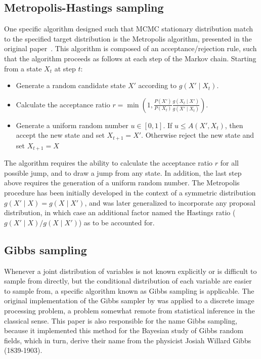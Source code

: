 \subsection{Metropolis-Hastings sampling}

One specific algorithm designed such that MCMC stationary distribution match to the specified target distribution is the Metropolis algorithm, presented in the original paper~\citep{Metropolis1953}.
This algorithm is composed of an acceptance/rejection rule, such that the algorithm proceeds as follows at each step of the Markov chain.
Starting from a state $X_t$ at step $t$:
\begin{itemize}
    \item Generate a random candidate state $X'$ according to $g(X'\mid X_t)$.
    \item Calculate the acceptance ratio $\displaystyle r=\min \left(1,{\frac {P(X')}{P(X_{t})}}{\frac {g(X_{t}\mid X')}{g(X'\mid X_{t})}}\right)$.
    \item Generate a uniform random number $u\in [0,1]$.
    If $u\leq A(X',X_{t})$, then accept the new state and set $X_{t+1}=X'$.
    Otherwise reject the new state and set $X_{t+1}=X$
\end{itemize}

The algorithm requires the ability to calculate the acceptance ratio $r$ for all possible jump, and to draw a jump from any state.
In addition, the last step above requires the generation of a uniform random number.
The Metropolis procedure has been initially developed in the context of a symmetric distribution $g(X'\mid X) = g(X \mid X')$, and was later generalized to incorporate any proposal distribution, in which case an additional factor named the Hastings ratio ($g(X'\mid X) / g(X \mid X')$) as to be accounted for.

\subsection{Gibbs sampling}

Whenever a joint distribution of variables is not known explicitly or is difficult to sample from directly, but the conditional distribution of each variable are easier to sample from, a specific algorithm known as Gibbs sampling is applicable.
The original implementation of the Gibbs sampler by \citet{Geman1984} was applied to a discrete image processing problem, a problem somewhat remote from statistical inference in the classical sense.
This paper is also responsible for the name Gibbs sampling, because it implemented this method for the Bayesian study of Gibbs random fields, which in turn, derive their name from the physicist Josiah Willard Gibbs (1839-1903).

